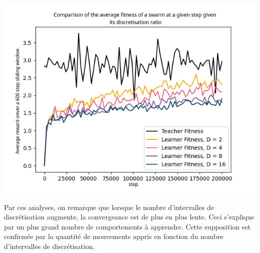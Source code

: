\documentclass[a4paper, 12pt]{report}
\begin{document}
	
	
\includegraphics{averageComparisons}


	Par ces analyses, on remarque que lorsque le nombre d'intervalles de discrétisation augmente, la convergeance est de plus en plus lente. Ceci s'explique par un plus grand nombre de comportements à apprendre.
	 Cette supposition est confirmée par la quantité de mouvements appris en fonction du nombre d'intervalles de discrétisation.
\end{document}
